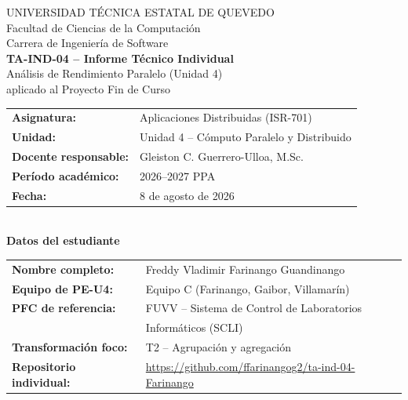 \documentclass[10pt,journal]{IEEEtran}
\begin{document}
\onecolumn
\begin{center}
\vspace*{1.0cm}
{\large UNIVERSIDAD T\'ECNICA ESTATAL DE QUEVEDO}\\[0.3em]
{\normalsize Facultad de Ciencias de la Computaci\'on}\\
{\normalsize Carrera de Ingenier\'ia de Software}\\[1.2em]

{\Large \textbf{TA-IND-04 -- Informe T\'ecnico Individual}}\\[0.4em]
{\large An\'alisis de Rendimiento Paralelo (Unidad 4)\\ aplicado al Proyecto Fin de Curso}\\[1.5em]

\begin{tabular}{ll}
\textbf{Asignatura:} & Aplicaciones Distribuidas (ISR-701)\\[0.2em]
\textbf{Unidad:} & Unidad 4 -- C\'omputo Paralelo y Distribuido\\[0.2em]
\textbf{Docente responsable:} & Gleiston C. Guerrero-Ulloa, M.Sc.\\[0.2em]
\textbf{Per\'iodo acad\'emico:} & 2026--2027 PPA\\[0.2em]
\textbf{Fecha:} & 8 de agosto de 2026\\
\end{tabular}\\[2.0em]

{\large \textbf{Datos del estudiante}}\\[0.4em]
\begin{tabular}{ll}
\textbf{Nombre completo:} & Freddy Vladimir Farinango Guandinango\\[0.2em]
\textbf{Equipo de PE-U4:} & Equipo C (Farinango, Gaibor, Villamar\'in)\\[0.2em]
\textbf{PFC de referencia:} & FUVV -- Sistema de Control de Laboratorios\\
 & Inform\'aticos (SCLI)\\[0.2em]
\textbf{Transformaci\'on foco:} & T2 -- Agrupaci\'on y agregaci\'on\\[0.2em]
\textbf{Repositorio individual:} & \url{https://github.com/ffarinangog2/ta-ind-04-Farinango}\\
\end{tabular}\\[2.0em]

\end{center}
\end{document}
